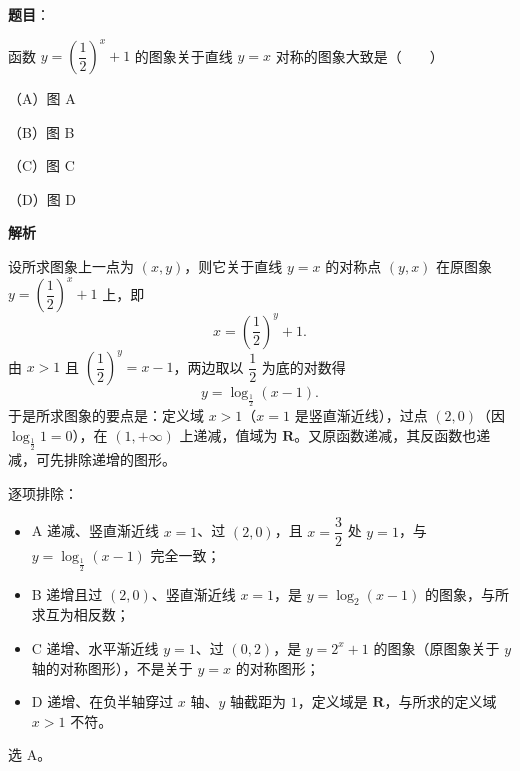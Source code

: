 \begin{answer}

\textbf{题目}：

函数 $y=\left(\dfrac12\right)^x+1$ 的图象关于直线 $y=x$ 对称的图象大致是\mbox{（　　）}

（A）图 A

（B）图 B

（C）图 C

（D）图 D
\nopagebreak[4]
\begin{center}\end{center}
\nopagebreak[4]
\textbf{解析}

设所求图象上一点为 $(x,y)$，则它关于直线 $y=x$ 的对称点 $(y,x)$ 在原图象 $y=\left(\dfrac12\right)^x+1$ 上，即
\nopagebreak[4]
\[
x=\left(\frac12\right)^{y}+1.
\]
由 $x>1$ 且 $\left(\dfrac12\right)^y=x-1$，两边取以 $\dfrac12$ 为底的对数得
\nopagebreak[4]
\[
y=\log_{\frac12}(x-1).
\]
于是所求图象的要点是：定义域 $x>1$（$x=1$ 是竖直渐近线），过点 $(2,0)$（因 $\log_{\frac12}1=0$），在 $(1,+\infty)$ 上递减，值域为 $\mathbf R$。又原函数递减，其反函数也递减，可先排除递增的图形。

逐项排除：

\begin{itemize}
\item A 递减、竖直渐近线 $x=1$、过 $(2,0)$，且 $x=\dfrac32$ 处 $y=1$，与 $y=\log_{\frac12}(x-1)$ 完全一致；
\item B 递增且过 $(2,0)$、竖直渐近线 $x=1$，是 $y=\log_2(x-1)$ 的图象，与所求互为相反数；
\item C 递增、水平渐近线 $y=1$、过 $(0,2)$，是 $y=2^x+1$ 的图象（原图象关于 $y$ 轴的对称图形），不是关于 $y=x$ 的对称图形；
\item D 递增、在负半轴穿过 $x$ 轴、$y$ 轴截距为 $1$，定义域是 $\mathbf R$，与所求的定义域 $x>1$ 不符。
\end{itemize}

选 A。


\end{answer}
